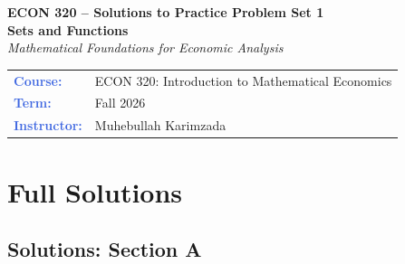 \documentclass[12pt, a4paper]{article}
\theoremstyle{definition}
\begin{document}

\thispagestyle{empty}

\vspace*{-1.5cm}
\begin{center}
  {\color{white}\large\bfseries\sffamily ECON 320 -- Solutions to Practice Problem Set 1}\\[10pt]
  {\color{white}\Huge\bfseries Sets and Functions}\\[8pt]
  {\color{gold}\large\itshape Mathematical Foundations for Economic Analysis}
\end{center}

\vspace{3.4cm}

\begin{center}
\begin{tabular}{l l}
  \textbf{\textcolor{royalblue}{Course:}}        & ECON 320: Introduction to Mathematical Economics \\[3pt]


  \textbf{\textcolor{royalblue}{Term:}}          & Fall 2026 \\[3pt]
    \textbf{\textcolor{royalblue}{Instructor:}}          & Muhebullah Karimzada \\[3pt]
\end{tabular}
\end{center}




\newpage





\newpage
\section{Full Solutions}

\subsection{Solutions: Section A}
\end{document}
